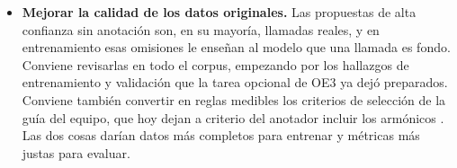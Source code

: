 \begin{itemize}
          de \citet{nguyen_assessing_2021}.
    \item \textbf{Mejorar la calidad de los datos originales.} Las propuestas de
          alta confianza sin anotación son, en su mayoría, llamadas reales, y en
          entrenamiento esas omisiones le enseñan al modelo que una llamada es
          fondo. Conviene revisarlas en todo el corpus, empezando por los
          hallazgos de entrenamiento y validación que la tarea opcional de OE3 ya
          dejó preparados. Conviene también convertir en reglas medibles los
          criterios de selección de la guía del equipo, que hoy dejan a criterio
          del anotador incluir los armónicos \citep{proyecto8_guia_2025}. Las dos
          cosas darían datos más completos para entrenar y métricas más justas
          para evaluar.
\end{itemize}
